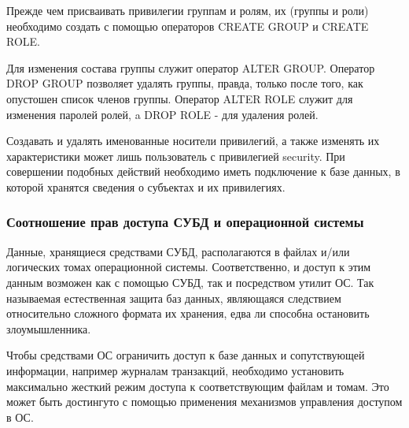 Прежде чем присваивать привилегии группам и ролям, их (группы и роли) необходимо создать с помощью
операторов CREATE GROUP и CREATE ROLE.

Для изменения состава группы служит оператор ALTER GROUP. Оператор DROP GROUP позволяет удалять
группы, правда, только после того, как опустошен список членов группы. Оператор ALTER ROLE служит
для изменения паролей ролей, a DROP ROLE - для удаления ролей.

Создавать и удалять именованные носители привилегий, а также изменять их характеристики может лишь
пользователь с привилегией security. При совершении подобных действий необходимо иметь подключение
к базе данных, в которой хранятся сведения о субъектах и их привилегиях.


\subsubsection{Соотношение прав доступа СУБД и операционной системы}

Данные, хранящиеся средствами СУБД, располагаются в файлах и/или логических томах операционной
системы. Соответственно, и доступ к этим данным возможен как с помощью СУБД, так и посредством
утилит ОС. Так называемая естественная защита баз данных, являющаяся следствием относительно
сложного формата их хранения, едва ли способна остановить злоумышленника.

Чтобы средствами ОС ограничить доступ к базе данных и сопутствующей информации,
например журналам транзакций, необходимо установить максимально жесткий режим доступа к
соответствующим файлам и томам. Это может быть достингуто с помощью применения механизмов
управления доступом в ОС.

